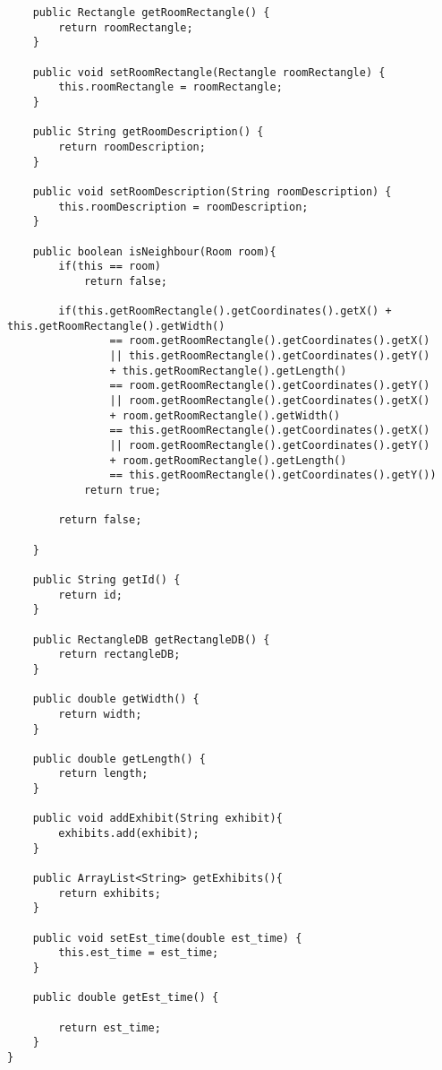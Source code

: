 \begin{lstlisting}
    public Rectangle getRoomRectangle() {
        return roomRectangle;
    }

    public void setRoomRectangle(Rectangle roomRectangle) {
        this.roomRectangle = roomRectangle;
    }

    public String getRoomDescription() {
        return roomDescription;
    }

    public void setRoomDescription(String roomDescription) {
        this.roomDescription = roomDescription;
    }

    public boolean isNeighbour(Room room){
        if(this == room)
            return false;

        if(this.getRoomRectangle().getCoordinates().getX() + this.getRoomRectangle().getWidth()
                == room.getRoomRectangle().getCoordinates().getX()
                || this.getRoomRectangle().getCoordinates().getY()
                + this.getRoomRectangle().getLength()
                == room.getRoomRectangle().getCoordinates().getY()
                || room.getRoomRectangle().getCoordinates().getX()
                + room.getRoomRectangle().getWidth()
                == this.getRoomRectangle().getCoordinates().getX()
                || room.getRoomRectangle().getCoordinates().getY()
                + room.getRoomRectangle().getLength()
                == this.getRoomRectangle().getCoordinates().getY())
            return true;

        return false;

    }

    public String getId() {
        return id;
    }

    public RectangleDB getRectangleDB() {
        return rectangleDB;
    }

    public double getWidth() {
        return width;
    }

    public double getLength() {
        return length;
    }

    public void addExhibit(String exhibit){
        exhibits.add(exhibit);
    }

    public ArrayList<String> getExhibits(){
        return exhibits;
    }

    public void setEst_time(double est_time) {
        this.est_time = est_time;
    }

    public double getEst_time() {

        return est_time;
    }
}
\end{lstlisting}
\newpage
